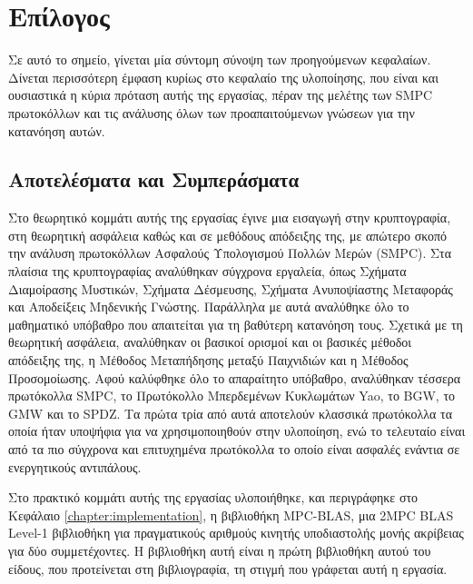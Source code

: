 \chapter{Επίλογος}
\label{chapter:postamble}

Σε αυτό το σημείο, γίνεται μία σύντομη σύνοψη των προηγούμενων κεφαλαίων. Δίνεται περισσότερη έμφαση κυρίως στο κεφαλαίο της υλοποίησης, που είναι και ουσιαστικά η κύρια πρόταση αυτής της εργασίας, πέραν της μελέτης των SMPC πρωτοκόλλων και τις ανάλυσης όλων των προαπαιτούμενων γνώσεων για την κατανόηση αυτών.

\section{Αποτελέσματα και Συμπεράσματα}

Στο θεωρητικό κομμάτι αυτής της εργασίας έγινε μια εισαγωγή στην κρυπτογραφία, στη θεωρητική ασφάλεια καθώς και σε μεθόδους απόδειξης της, με απώτερο σκοπό την ανάλυση πρωτοκόλλων Ασφαλούς Υπολογισμού Πολλών Μερών (SMPC). Στα πλαίσια της κρυπτογραφίας αναλύθηκαν σύγχρονα εργαλεία, όπως Σχήματα Διαμοίρασης Μυστικών, Σχήματα Δέσμευσης, Σχήματα Ανυποψίαστης Μεταφοράς και Αποδείξεις Μηδενικής Γνώστης. Παράλληλα με αυτά αναλύθηκε όλο το μαθηματικό υπόβαθρο που απαιτείται για τη βαθύτερη κατανόηση τους. Σχετικά με τη θεωρητική ασφάλεια, αναλύθηκαν οι βασικοί ορισμοί και οι βασικές μέθοδοι απόδειξης της, η Μέθοδος Μεταπήδησης μεταξύ Παιχνιδιών και η Μέθοδος Προσομοίωσης. Αφού καλύφθηκε όλο το απαραίτητο υπόβαθρο, αναλύθηκαν τέσσερα πρωτόκολλα SMPC, το Πρωτόκολλο Μπερδεμένων Κυκλωμάτων Yao, το BGW, το GMW και το SPDZ. Τα πρώτα τρία από αυτά αποτελούν κλασσικά πρωτόκολλα τα οποία ήταν υποψήφια για να χρησιμοποιηθούν στην υλοποίηση, ενώ το τελευταίο είναι από τα πιο σύγχρονα και επιτυχημένα πρωτόκολλα το οποίο είναι ασφαλές ενάντια σε ενεργητικούς αντιπάλους.

Στο πρακτικό κομμάτι αυτής της εργασίας υλοποιήθηκε, και περιγράφηκε στο Κεφάλαιο \ref{chapter:implementation}, η βιβλιοθήκη MPC-BLAS, μια 2MPC BLAS Level-1 βιβλιοθήκη για πραγματικούς αριθμούς κινητής υποδιαστολής μονής ακρίβειας για δύο συμμετέχοντες. Η βιβλιοθήκη αυτή είναι η πρώτη βιβλιοθήκη αυτού του είδους, που προτείνεται στη βιβλιογραφία, τη στιγμή που γράφεται αυτή η εργασία.

